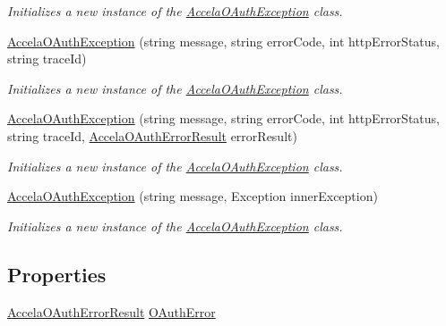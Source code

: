 \begin{DoxyCompactItemize}
\begin{DoxyCompactList}\small\item\em Initializes a new instance of the \hyperlink{class_accela_1_1_windows_store_s_d_k_1_1_accela_o_auth_exception}{Accela\+O\+Auth\+Exception} class. \end{DoxyCompactList}\item 
\hyperlink{class_accela_1_1_windows_store_s_d_k_1_1_accela_o_auth_exception_a65e3a37f0f9354a07508bb50feee3b70}{Accela\+O\+Auth\+Exception} (string message, string error\+Code, int http\+Error\+Status, string trace\+Id)
\begin{DoxyCompactList}\small\item\em Initializes a new instance of the \hyperlink{class_accela_1_1_windows_store_s_d_k_1_1_accela_o_auth_exception}{Accela\+O\+Auth\+Exception} class. \end{DoxyCompactList}\item 
\hyperlink{class_accela_1_1_windows_store_s_d_k_1_1_accela_o_auth_exception_adcd3b69e19d0f44650194f9c2fdbf7c5}{Accela\+O\+Auth\+Exception} (string message, string error\+Code, int http\+Error\+Status, string trace\+Id, \hyperlink{class_accela_1_1_windows_store_s_d_k_1_1_accela_o_auth_error_result}{Accela\+O\+Auth\+Error\+Result} error\+Result)
\begin{DoxyCompactList}\small\item\em Initializes a new instance of the \hyperlink{class_accela_1_1_windows_store_s_d_k_1_1_accela_o_auth_exception}{Accela\+O\+Auth\+Exception} class. \end{DoxyCompactList}\item 
\hyperlink{class_accela_1_1_windows_store_s_d_k_1_1_accela_o_auth_exception_affc9e0552d9edeeda7f2dacbe341f5fc}{Accela\+O\+Auth\+Exception} (string message, Exception inner\+Exception)
\begin{DoxyCompactList}\small\item\em Initializes a new instance of the \hyperlink{class_accela_1_1_windows_store_s_d_k_1_1_accela_o_auth_exception}{Accela\+O\+Auth\+Exception} class. \end{DoxyCompactList}\end{DoxyCompactItemize}
\subsection*{Properties}
\begin{DoxyCompactItemize}
\item 
\hyperlink{class_accela_1_1_windows_store_s_d_k_1_1_accela_o_auth_error_result}{Accela\+O\+Auth\+Error\+Result} \hyperlink{class_accela_1_1_windows_store_s_d_k_1_1_accela_o_auth_exception_a68c76a9c52f9a60181a61e40bd3ca6d0}{O\+Auth\+Error}
\end{DoxyCompactItemize}


